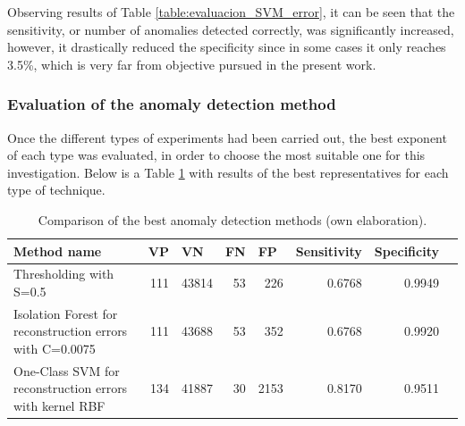 \begin{itemize}
Observing results of Table \ref{table:evaluacion_SVM_error}, it can be seen that the sensitivity, or number of anomalies detected correctly, was significantly increased, however, it drastically reduced the specificity since in some cases it only reaches 3.5\%, which is very far from objective pursued in the present work.

\end{itemize}

\subsubsection{Evaluation of the anomaly detection method}

Once the different types of experiments had been carried out, the best exponent of each type was evaluated, in order to choose the most suitable one for this investigation. Below is a Table \ref{table:evaluacion_metodo_anomalias} with results of the best representatives for each type of technique.

\begin{table}[H]
\centering
\begin{center}
\begin{tabular}{|p{40mm}|r|r|r|r|r|r|r|}
\hline
\textbf{Method name} & \multicolumn{1}{l|}{\textbf{VP}} & \multicolumn{1}{l|}{\textbf{VN}}& \multicolumn{1}{l|}{\textbf{FN}}& \multicolumn{1}{l|}{\textbf{FP}} & \multicolumn{1}{l|}{\textbf{Sensitivity}} & \multicolumn{1}{l|}{\textbf{Specificity}} \\ \hline
Thresholding with S=0.5 & \cellcolor[HTML]{AADD99} 111 & \cellcolor[HTML]{AADD99} 43814 & \cellcolor[HTML]{FFCE93} 53 & \cellcolor[HTML]{FFCE93} 226 & 0.6768 & 0.9949 \\ \hline
Isolation Forest for reconstruction errors with C=0.0075 & \cellcolor[HTML]{AADD99} 111 & \cellcolor[HTML]{AADD99} 43688 & \cellcolor[HTML]{FFCE93} 53 & \cellcolor[HTML]{FFCE93} 352 & 0.6768 & 0.9920 \\ \hline
One-Class SVM for reconstruction errors with kernel RBF& \cellcolor[HTML]{AADD99} 134 & \cellcolor[HTML]{AADD99} 41887 & \cellcolor[HTML]{FFCE93} 30 & \cellcolor[HTML]{FFCE93} 2153 & 0.8170 & 0.9511 \\ \hline
\end{tabular}
\end{center}
\caption{Comparison of the best anomaly detection methods (own elaboration).}

\label{table:evaluacion_metodo_anomalias}
\end{table}

